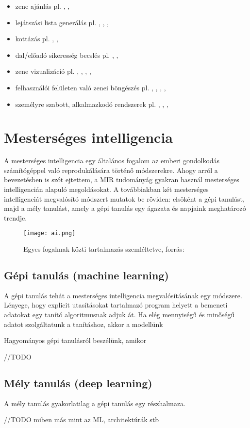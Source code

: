 \begin{itemize}
\begin{itemize}
	\item zene ajánlás pl. \cite{recommend1}, \cite{recommend2}, \cite{recommend3}
	\item lejátszási lista generálás  pl. \cite{playlist1}, \cite{playlist2}, \cite{playlist3}, \cite{playlist4}
	\item kottázás pl. \cite{score1}, \cite{score2}, \cite{score3}
	\item dal/előadó sikeresség becslés pl. \cite{popularity1}, \cite{popularity2}, \cite{popularity3}
	\item zene vizualizáció pl. \cite{visualization1}, \cite{visualization2}, \cite{visualization3}, \cite{visualization4}, \cite{visualization5}
	\item felhasználói felületen való zenei böngészés pl. \cite{ui1}, \cite{ui2}, \cite{ui3}, \cite{ui4}, \cite{ui5}
	\item személyre szabott, alkalmazkodó rendszerek pl. \cite{adaptive1}, \cite{adaptive2}, \cite{adaptive3}, \cite{adaptive4}
	\end{itemize}
\end{itemize}


\section{Mesterséges intelligencia}

A mesterséges intelligencia egy általános fogalom az emberi gondolkodás számítógéppel való reprodukálására történő módszerekre. Ahogy arról a bevezetésben is szót ejtettem, a MIR tudományág gyakran használ mesterséges intelligencián alapuló megoldásokat. A továbbiakban két mesterséges intelligenciát megvalósító módszert mutatok be röviden: elsőként a gépi tanulást, majd a mély tanulást, amely a gépi tanulás egy ágazata és napjaink meghatározó trendje. \cite{ai}

\begin{figure}[H]
  \texttt{[image: ai.png]}
  \caption{Egyes fogalmak közti tartalmazás szemléltetve, forrás: \cite{ai} }
\end{figure}

\subsection{Gépi tanulás (machine learning)}

A gépi tanulás tehát a mesterséges intelligencia megvalósításának egy módszere. Lényege, hogy explicit utasításokat tartalmazó program helyett a bemeneti adatokat egy tanító algoritmusnak adjuk át. Ha elég mennyiségű és minőségű adatot szolgáltatunk a tanításhoz, akkor a modellünk 

Hagyományos gépi tanulásról beszélünk, amikor 

//TODO


\subsection{Mély tanulás (deep learning)}

A mély tanulás gyakorlatilag a gépi tanulás egy részhalmaza. 

//TODO  miben más mint az ML, architektúrák stb